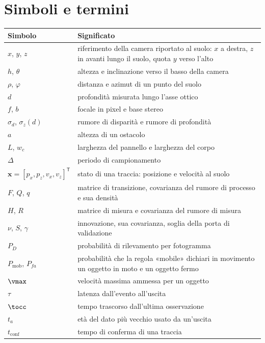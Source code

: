 \section*{Simboli e termini}\label{sec:simboli}

{\small
\begin{tabularx}{\textwidth}{@{}p{2.6cm}L@{}}
\toprule
Simbolo & Significato\\
\midrule
$x$, $y$, $z$ & riferimento della camera riportato al suolo: $x$ a destra, $z$ in avanti lungo il suolo, quota $y$ verso l'alto\\
$h$, $\theta$ & altezza e inclinazione verso il basso della camera\\
$\rho$, $\varphi$ & distanza e azimut di un punto del suolo\\
$d$ & profondità misurata lungo l'asse ottico\\
$f$, $b$ & focale in pixel e base stereo\\
$\sigma_d$, $\sigma_z(d)$ & rumore di disparità e rumore di profondità\\
$a$ & altezza di un ostacolo\\
$L$, $w_c$ & larghezza del pannello e larghezza del corpo\\
$\Delta$ & periodo di campionamento\\
$\mathbf x=[p_x,p_z,v_x,v_z]^{\mathsf T}$ & stato di una traccia: posizione e velocità al suolo\\
$F$, $Q$, $q$ & matrice di transizione, covarianza del rumore di processo e sua densità\\
$H$, $R$ & matrice di misura e covarianza del rumore di misura\\
$\nu$, $S$, $\gamma$ & innovazione, sua covarianza, soglia della porta di validazione\\
$P_D$ & probabilità di rilevamento per fotogramma\\
$P_{\mathrm{mob}}$, $P_{fa}$ & probabilità che la regola «mobile» dichiari in movimento un oggetto in moto e un oggetto fermo\\
$\vmax$ & velocità massima ammessa per un oggetto\\
$\tau$ & latenza dall'evento all'uscita\\
$\tocc$ & tempo trascorso dall'ultima osservazione\\
$t_a$ & età del dato più vecchio usato da un'uscita\\
$t_{\mathrm{conf}}$ & tempo di conferma di una traccia\\

\end{tabularx}}
